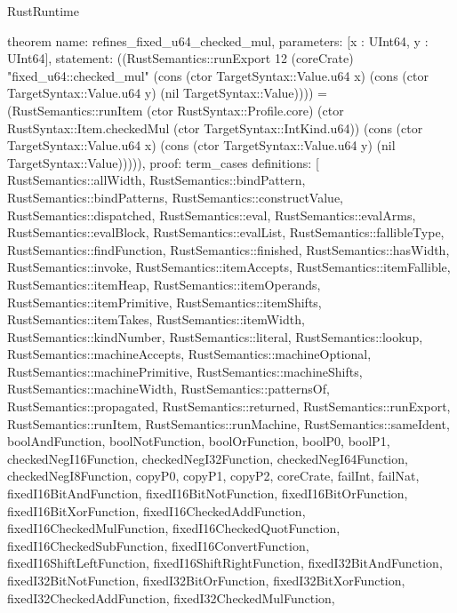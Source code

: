 \begin{lexlean}{RustRuntime}
\begin{semanticmodule}
theorem{
  name: refines_fixed_u64_checked_mul,
  parameters: [x : UInt64, y : UInt64],
  statement: ((RustSemantics::runExport 12 (coreCrate) "fixed_u64::checked_mul" (cons (ctor TargetSyntax::Value.u64 x) (cons (ctor TargetSyntax::Value.u64 y) (nil TargetSyntax::Value)))) = (RustSemantics::runItem (ctor RustSyntax::Profile.core) (ctor RustSyntax::Item.checkedMul (ctor TargetSyntax::IntKind.u64)) (cons (ctor TargetSyntax::Value.u64 x) (cons (ctor TargetSyntax::Value.u64 y) (nil TargetSyntax::Value))))),
  proof: term_cases{
    definitions: [
      RustSemantics::allWidth,
      RustSemantics::bindPattern,
      RustSemantics::bindPatterns,
      RustSemantics::constructValue,
      RustSemantics::dispatched,
      RustSemantics::eval,
      RustSemantics::evalArms,
      RustSemantics::evalBlock,
      RustSemantics::evalList,
      RustSemantics::fallibleType,
      RustSemantics::findFunction,
      RustSemantics::finished,
      RustSemantics::hasWidth,
      RustSemantics::invoke,
      RustSemantics::itemAccepts,
      RustSemantics::itemFallible,
      RustSemantics::itemHeap,
      RustSemantics::itemOperands,
      RustSemantics::itemPrimitive,
      RustSemantics::itemShifts,
      RustSemantics::itemTakes,
      RustSemantics::itemWidth,
      RustSemantics::kindNumber,
      RustSemantics::literal,
      RustSemantics::lookup,
      RustSemantics::machineAccepts,
      RustSemantics::machineOptional,
      RustSemantics::machinePrimitive,
      RustSemantics::machineShifts,
      RustSemantics::machineWidth,
      RustSemantics::patternsOf,
      RustSemantics::propagated,
      RustSemantics::returned,
      RustSemantics::runExport,
      RustSemantics::runItem,
      RustSemantics::runMachine,
      RustSemantics::sameIdent,
      boolAndFunction,
      boolNotFunction,
      boolOrFunction,
      boolP0,
      boolP1,
      checkedNegI16Function,
      checkedNegI32Function,
      checkedNegI64Function,
      checkedNegI8Function,
      copyP0,
      copyP1,
      copyP2,
      coreCrate,
      failInt,
      failNat,
      fixedI16BitAndFunction,
      fixedI16BitNotFunction,
      fixedI16BitOrFunction,
      fixedI16BitXorFunction,
      fixedI16CheckedAddFunction,
      fixedI16CheckedMulFunction,
      fixedI16CheckedQuotFunction,
      fixedI16CheckedSubFunction,
      fixedI16ConvertFunction,
      fixedI16ShiftLeftFunction,
      fixedI16ShiftRightFunction,
      fixedI32BitAndFunction,
      fixedI32BitNotFunction,
      fixedI32BitOrFunction,
      fixedI32BitXorFunction,
      fixedI32CheckedAddFunction,
      fixedI32CheckedMulFunction,
}}
\end{semanticmodule}
\end{lexlean}
